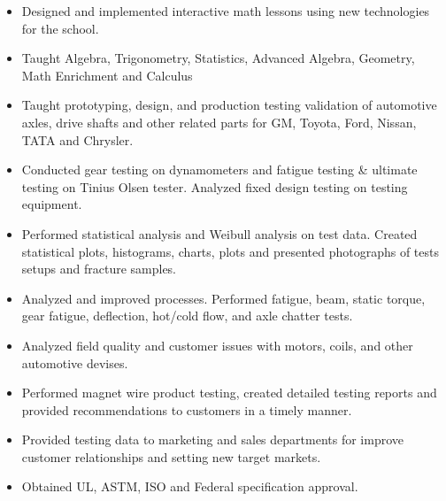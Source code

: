 \documentclass[10pt,a4paper]{altacv}
\begin{document}
\divider


\begin{itemize}
\item Designed and implemented interactive math lessons using new technologies for the school.
\item Taught Algebra, Trigonometry, Statistics, Advanced Algebra, Geometry, Math Enrichment and Calculus
\end{itemize}
\divider

\begin{itemize}
\item Taught prototyping, design, and production testing validation of automotive axles, drive shafts and other related parts for GM, Toyota, Ford, Nissan, TATA and Chrysler. 
\item Conducted gear testing on dynamometers and fatigue testing \& ultimate testing on Tinius Olsen tester. Analyzed fixed design testing on testing equipment. 
\item Performed statistical analysis and Weibull analysis on test data. Created statistical plots, histograms, charts, plots and presented photographs of tests setups and fracture samples. 
\item Analyzed and improved processes. Performed fatigue, beam, static torque, gear fatigue, deflection, hot/cold flow, and axle chatter tests.  

\end{itemize}
\divider

\begin{itemize}
\item Analyzed field quality and customer issues with motors, coils, and other automotive devises. 
\item Performed magnet wire product testing, created detailed testing reports and provided recommendations to customers in a timely manner.   
\item Provided testing data to marketing and sales departments for improve customer relationships and setting new target markets.
\item Obtained UL, ASTM, ISO and Federal specification approval.

\end{itemize}
\end{document}
